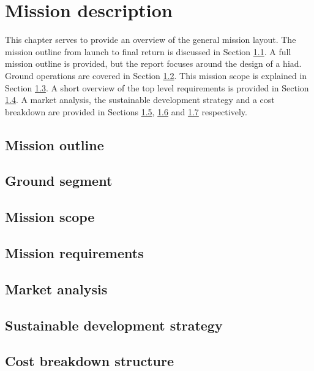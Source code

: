 \section{Mission description}\label{cha:missiondescr}

This chapter serves to provide an overview of the general mission layout. The mission outline from launch to final return is discussed in Section \ref{sec:missionoutline}. A full mission outline is provided, but the report focuses around the design of a \gls{hiad}. Ground operations are covered in Section \ref{sec:gop}. This mission scope is explained in Section \ref{sec:missionscope}. A short overview of the top level requirements is provided in Section \ref{sec:missionreq}. A market analysis, the sustainable development strategy and a cost breakdown are provided in Sections \ref{sec:marketanalysis}, \ref{sec:sustainable} and \ref{sec:costbreakdown} respectively. 

\subsection{Mission outline} \label{sec:missionoutline}


\subsection{Ground segment} \label{sec:gop}


\subsection{Mission scope} \label{sec:missionscope}


\subsection{Mission requirements} \label{sec:missionreq}


\subsection{Market analysis} \label{sec:marketanalysis}


\subsection{Sustainable development strategy} \label{sec:sustainable}


\subsection{Cost breakdown structure} \label{sec:costbreakdown}


%

